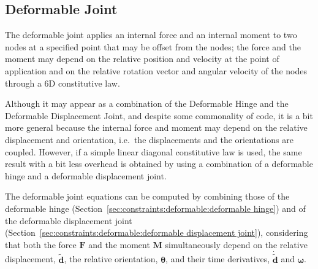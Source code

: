 \documentclass[10pt,fleqn,subeqn]{report}
\newcommand{\T}[1]{\bm{#1}}
\begin{document}
\subsection{Deformable Joint}
\label{sec:constraints:deformable:deformable joint}
The deformable joint applies an internal force and an internal moment
to two nodes at a specified point that may be offset from the nodes;
the force and the moment may depend on the relative position and velocity
at the point of application and on the relative rotation vector and angular 
velocity of the nodes through a 6D constitutive law.

Although it may appear as a combination of the Deformable Hinge
and the Deformable Displacement Joint, and despite some commonality
of code, it is a bit more general because the internal force
and moment may depend on the relative displacement and orientation,
i.e.\ the displacements and the orientations are coupled.
However, if a simple linear diagonal constitutive law is used,
the same result with a bit less overhead is obtained by using
a combination of a deformable hinge and a deformable displacement joint.

\noindent
The deformable joint equations can be computed by combining
those of the deformable hinge
(Section~\ref{sec:constraints:deformable:deformable hinge})
and of the deformable displacement joint
(Section~\ref{sec:constraints:deformable:deformable displacement joint}),
considering that both the force $\T{F}$ and the moment $\T{M}$
simultaneously depend on the relative displacement, $\tilde{\T{d}}$,
the relative orientation, $\T{\theta}$, and their time derivatives,
$\dot{\tilde{\T{d}}}$ and $\T{\omega}$.
\end{document}
